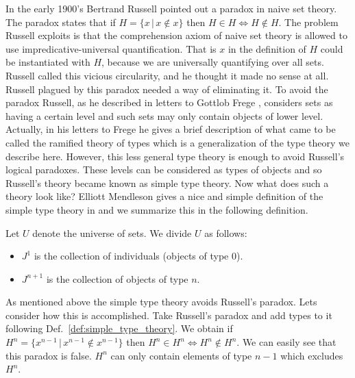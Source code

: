 In the early 1900's Bertrand Russell pointed out a paradox in naive
set theory.  The paradox states that if $H = \{ x\,|\,x \not \in x \}$
then $H \in H \iff H \not \in H$.  The problem Russell exploits is
that the comprehension axiom of naive set theory is allowed to use
impredicative-universal quantification. That is $x$ in the definition
of $H$ could be instantiated with $H$, because we are universally
quantifying over all sets.  Russell called this vicious circularity,
and he thought it made no sense at all. Russell plagued by this
paradox needed a way of eliminating it.  To avoid the paradox Russell,
as he described in letters to Gottlob Frege \cite{Hintikka:1995,
  Heijenoort:1967}, considers sets as having a certain level and such
sets may only contain objects of lower level.  Actually, in his
letters to Frege he gives a brief description of what came to be
called the ramified theory of types which is a generalization of the
type theory we describe here.  However, this less general type theory
is enough to avoid Russell's logical paradoxes.  These levels can be
considered as types of objects and so Russell's theory became known as
simple type theory.  Now what does such a theory look like?  Elliott
Mendleson gives a nice and simple definition of the simple type theory
in \cite{Mendelson:2009} and we summarize this in the following
definition.
\begin{definition}
  \label{def:simple_type_theory}
  Let $U$ denote the universe of sets. We divide $U$ as follows:
  \begin{itemize}
  \item $J^1$ is the collection of individuals (objects of type $0$).
  \item $J^{n+1}$ is the collection of objects of type $n$.
  \end{itemize}
\end{definition}
As mentioned above the simple type theory avoids Russell's paradox.
Lets consider how this is accomplished.  Take Russell's paradox
and add types to it following Def.~\ref{def:simple_type_theory}.  We
obtain if $H^n = \{ x^{n-1}\,|\,x^{n-1} \not \in x^{n-1} \}$ then $H^n
\in H^n \iff H^n \not \in H^n$.  We can easily see that this paradox is
false.  $H^n$ can only contain elements of type $n-1$ which excludes
$H^n$.

